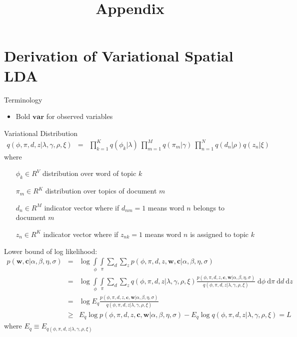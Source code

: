 \documentclass[]{article}
\title{Appendix}
\author{}
\begin{document}
\maketitle

\section*{Derivation of Variational Spatial LDA}

Terminology
\begin{itemize}
	\item Bold $\boldsymbol{var}$ for observed variables
\end{itemize}

Variational Distribution
\begin{eqnarray}
q(\phi,\pi,d,z | \lambda,\gamma,\rho,\xi) &=& \prod\limits_{k=1}^{K}q(\phi_k|\lambda) \: \prod\limits_{m=1}^{M}q(\pi_m|\gamma) \: \prod\limits_{n=1}^{N}q(d_n | \rho) q(z_n | \xi)
\end{eqnarray}
where 
\begin{itemize}
	\item[$\phi_k \in R^V$] distribution over word of topic $k$
	\item[$\pi_m \in R^K$] distribution over topics of document $m$
	\item[$d_n \in R^M$] indicator vector where if $d_{nm} = 1$ means word $n$ belongs to document $m$
	\item[$z_n \in R^K$] indicator vector where if $z_{nk} = 1$ means word $n$ is assigned to topic $k$
\end{itemize}

Lower bound of log likelihood:
\begin{eqnarray}
p(\boldsymbol{w}, \boldsymbol{c} | \alpha,\beta,\eta,\sigma) 
&=& \log \int\limits_{\phi} \int\limits_{\pi} \sum\limits_{d} \sum\limits_{z} p(\phi,\pi,d,z,\boldsymbol{w},\boldsymbol{c} | \alpha,\beta,\eta,\sigma) \\
&=&  \log \int\limits_{\phi} \int\limits_{\pi} \sum\limits_{d} \sum\limits_{z} q(\phi,\pi,d,z | \lambda,\gamma,\rho,\xi) \frac{p(\phi,\pi,d,z,\boldsymbol{c},\boldsymbol{w} | \alpha,\beta,\eta,\sigma)}{q(\phi,\pi,d,z | \lambda,\gamma,\rho,\xi)} \; \mathrm{d}\phi \: \mathrm{d}\pi \: \mathrm{d}d \: \mathrm{d}z\\
&=& \log E_q \frac{p(\phi,\pi,d,z,\boldsymbol{c},\boldsymbol{w} | \alpha,\beta,\eta,\sigma)}{q(\phi,\pi,d,z | \lambda,\gamma,\rho,\xi)} \\
&\ge& E_q \log p(\phi,\pi,d,z,\boldsymbol{c},\boldsymbol{w} | \alpha,\beta,\eta,\sigma) - E_q \log q(\phi,\pi,d,z | \lambda,\gamma,\rho,\xi) = L
\end{eqnarray}
where $E_q \equiv E_{q(\phi,\pi,d,z | \lambda,\gamma,\rho,\xi)}$
\end{document}
